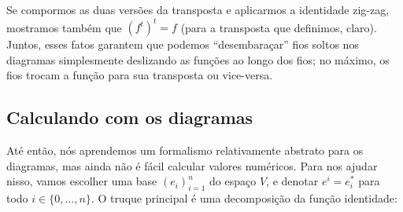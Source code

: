 \documentclass[11pt]{article}
\begin{document}
\begin{latexfigure}
\end{latexfigure}

Se compormos as duas versões da transposta e aplicarmos a identidade zig-zag,
mostramos também que \((f^t)^t=f\) (para a transposta que definimos, claro).
Juntos, esses fatos garantem que podemos ``desembaraçar'' fios soltos nos
diagramas simplesmente deslizando as funções ao longo dos fios; no máximo, os
fios trocam a função para sua transposta ou vice-versa.

\subsection{Calculando com os diagramas}
\label{sec:calculando-com-os-diagramas}
Até então, nós aprendemos um formalismo relativamente abstrato para os diagramas, mas ainda não é fácil calcular valores numéricos. Para nos ajudar nisso, vamos escolher uma base \((e_i)_{i=1}^n\) do espaço \(V\), e denotar \(e^i=e_i^*\) para todo \(i\in\{0,...,n\}\). O truque principal é uma decomposição da função identidade:

\begin{latexfigure}
\end{latexfigure}
\end{document}
